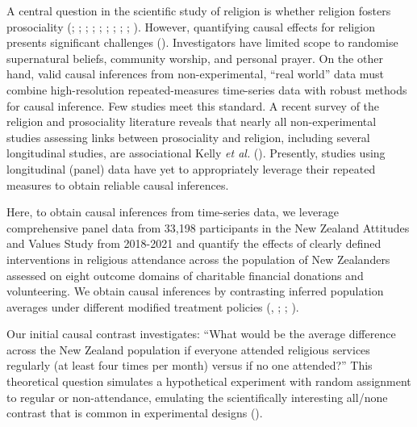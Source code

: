 \documentclass[
  single column]{article}
\begin{document}
A central question in the scientific study of religion is whether
religion fosters prosociality (; ;
;
;
;
; ; ;
;
). However,
quantifying causal effects for religion presents significant challenges
(). Investigators
have limited scope to randomise supernatural beliefs, community worship,
and personal prayer. On the other hand, valid causal inferences from
non-experimental, ``real world'' data must combine high-resolution
repeated-measures time-series data with robust methods for causal
inference. Few studies meet this standard. A recent survey of the
religion and prosociality literature reveals that nearly all
non-experimental studies assessing links between prosociality and
religion, including several longitudinal studies, are associational
Kelly \emph{et al.} ().
Presently, studies using longitudinal (panel) data have yet to
appropriately leverage their repeated measures to obtain reliable causal
inferences.

Here, to obtain causal inferences from time-series data, we leverage
comprehensive panel data from 33,198 participants in the New Zealand
Attitudes and Values Study from 2018-2021 and quantify the effects of
clearly defined interventions in religious attendance across the
population of New Zealanders assessed on eight outcome domains of
charitable financial donations and volunteering. We obtain causal
inferences by contrasting inferred population averages under different
modified treatment policies (, ;
;
).

Our initial causal contrast investigates: ``What would be the average
difference across the New Zealand population if everyone attended
religious services regularly (at least four times per month) versus if
no one attended?'' This theoretical question simulates a hypothetical
experiment with random assignment to regular or non-attendance,
emulating the scientifically interesting all/none contrast that is
common in experimental designs ().
\end{document}
